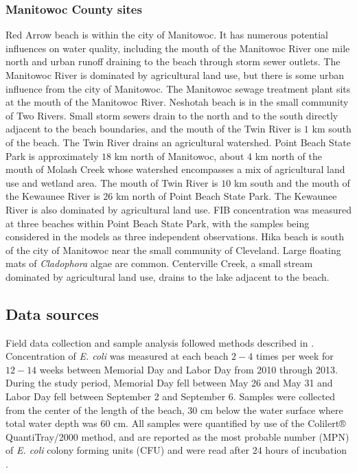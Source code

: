\documentclass[authoryear,review, 12pt]{elsarticle}
\begin{document}
\subsubsection{Manitowoc County sites}\label{manitowoc-county-sites}

Red Arrow beach is within the city of Manitowoc. It has numerous
potential influences on water quality, including the mouth of the
Manitowoc River one mile north and urban runoff draining to the beach
through storm sewer outlets. The Manitowoc River is dominated by
agricultural land use, but there is some urban influence from the city
of Manitowoc. The Manitowoc sewage treatment plant sits at the mouth of
the Manitowoc River. Neshotah beach is in the small community of Two
Rivers. Small storm sewers drain to the north and to the south directly
adjacent to the beach boundaries, and the mouth of the Twin River is
\(1\) km south of the beach. The Twin River drains an agricultural
watershed. Point Beach State Park is approximately \(18\) km north of
Manitowoc, about \(4\) km north of the mouth of Molash Creek whose
watershed encompasses a mix of agricultural land use and wetland area.
The mouth of Twin River is \(10\) km south and the mouth of the Kewaunee
River is \(26\) km north of Point Beach State Park. The Kewaunee River
is also dominated by agricultural land use. FIB concentration was
measured at three beaches within Point Beach State Park, with the
samples being considered in the models as three independent
observations. Hika beach is south of the city of Manitowoc near the
small community of Cleveland. Large floating mats of \emph{Cladophora}
algae are common. Centerville Creek, a small stream dominated by
agricultural land use, drains to the lake adjacent to the beach.

\subsection{Data sources}\label{data-sources}

Field data collection and sample analysis followed methods described in
\cite{Francy-et-al-2013}. Concentration of \emph{E. coli} was measured at each
beach \(2-4\) times per week for \(12-14\) weeks between Memorial Day 
and Labor Day from 2010 through 2013. During the study period, Memorial Day fell between May 26 and May 31 and Labor Day fell between September 2 and September 6. Samples were collected from the 
center of the length of the beach, \(30\) cm below the water surface
where total water depth was \(60\) cm. All samples were quantified by
use of the Colilert® QuantiTray/2000 method, and are reported as the
most probable number (MPN) of \emph{E. coli} colony forming units (CFU)
and were read after \(24\) hours of incubation \citep{Colilert}.
\end{document}
